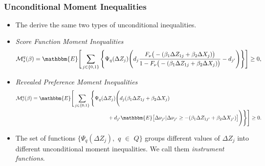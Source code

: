 \begin{frame}
\frametitle{Unconditional Moment Inequalities}

\begin{itemize}
	\item The derive the same two types of unconditional inequalities.
	\item \textit{Score Function Moment Inequalities}
	\small
	\begin{align*}
	\mathcal{M}^{q}_{s}(\beta)=\mathbbm{E}\Bigg[\sum_{j\in\{0,1\}}\Bigg\{\Psi_{q}(\Delta Z_{j})\Bigg(d_{j}\frac{F_{\nu}\big(-(\beta_{1}\Delta Z_{1j}+\beta_{2}\Delta X_{j})\big)}{1-F_{\nu}\big(-(\beta_{1}\Delta Z_{1j}+\beta_{2}\Delta X_{j})\big)}-d_{j'}\Bigg)\Bigg\}\Bigg]\geq 0,
	\end{align*}
	\normalsize
	\item \textit{Revealed Preference Moment Inequalities}
	\small
	\begin{align*}
	\mathcal{M}^{q}_{r}(\beta)=\mathbbm{E}\Bigg[\sum_{j\in\{0,1\}}\Bigg\{\Psi_{q}(\Delta &Z_{j})\Bigg(d_{j}(\beta_{1}\Delta Z_{1j}+\beta_{2}\Delta X_{j})\nonumber\\
	&+d_{j'}\mathbbm{E}\big[\Delta\nu_{j'}|\Delta\nu_{j'}\geq-(\beta_{1}\Delta Z_{1j'}+\beta_{2}\Delta X_{j'})\big]\Bigg)\Bigg\}\Bigg]\geq 0.
	\end{align*}
	\normalsize
	\item The set of functions $\{\Psi_{q}(\Delta Z_{j}),$ $q$ $\in$ $Q\}$ groups different values of $\Delta Z_{j}$ into different unconditional moment inequalities. We call them \textit{instrument functions}.
\end{itemize}
\end{frame}


